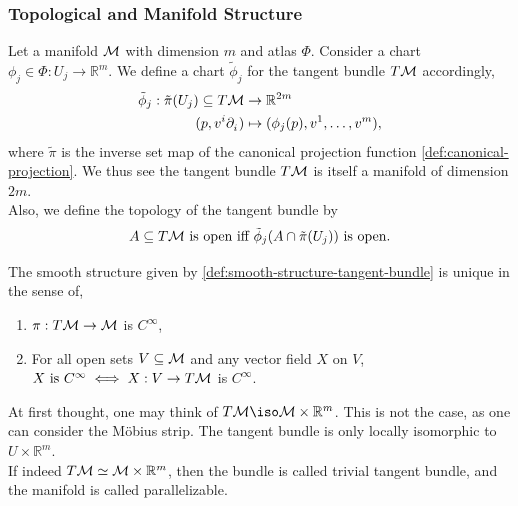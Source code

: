 \documentclass[../main.tex]{subfiles}
\begin{document}
    \subsubsection{Topological and Manifold Structure}
    \begin{definition}\label{def:smooth-structure-tangent-bundle}
        Let a manifold \(\manifold[M]\) with dimension \(m\) and atlas \(\Phi\). 
        Consider a chart \(\phi_j \in \Phi : U_j \to \mathbb{R}^m\). We define 
        a chart \(\tilde{\phi}_j\) for the tangent bundle \(T\manifold[M]\) 
        accordingly, 
        \[
        \begin{aligned}
            \tilde{\phi}_j : \tilde{\pi}(U_j) \subseteq T\manifold[M] &\to 
            \mathbb{R}^{2m} \\
            (p, v^i\tfld{i}) &\mapsto (\phi_j(p), v^1, \dots, v^m),
        \end{aligned}
        \]
        where \(\tilde{\pi}\) is the inverse set map of the canonical projection 
        function \cref{def:canonical-projection}. We thus see the tangent bundle 
        \(T\manifold[M]\) is itself a manifold of dimension \(2m\).\\
        Also, we define the topology of the tangent bundle by 
        \[
        A \subseteq T\manifold[M] \text{ is open iff }
        \tilde{\phi}_j(A \cap \tilde{\pi}(U_j)) \text{ is open.}
        \]
    \end{definition}
    \begin{theorem}
        The smooth structure given by \cref{def:smooth-structure-tangent-bundle} 
        is unique in the sense of, 
        \begin{enumerate}
            \item \(\pi : T\manifold[M] \to \manifold[M]\) is \(C^\infty\),
            \item For all open sets \(V \subseteq \manifold[M]\) and any vector 
            field \(X\) on \(V\), \(X \text{ is } C^\infty \iff 
            X : V \to T\manifold[M]\) is \(C^\infty\).
        \end{enumerate}
    \end{theorem}
    \begin{remark}
        At first thought, one may think of \(T\manifold[M] \iso 
        \manifold[M] \times \mathbb{R}^m\). This is not the case, as one can 
        consider the M{\"o}bius strip. The tangent bundle is only locally 
        isomorphic to \(U \times \mathbb{R}^m\).\\
        If indeed \(T\manifold[M] \simeq \manifold[M] \times \mathbb{R}^m\), 
        then the bundle is called trivial tangent bundle, and the manifold is 
        called parallelizable.
    \end{remark}
\end{document}
